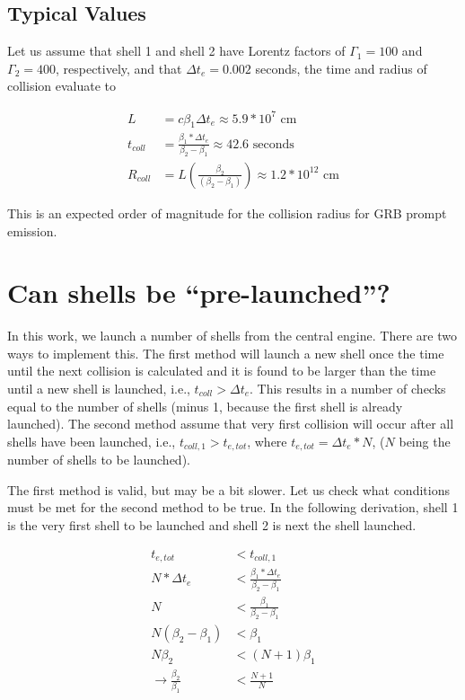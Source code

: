 \documentclass[10pt]{article}
\begin{document}
\subsection*{Typical Values}

Let us assume that shell 1 and shell 2 have Lorentz factors of $\Gamma_1=100$ and $\Gamma_2=400$, respectively, and that $\Delta t_e = 0.002$ seconds, the time and radius of collision evaluate to

\begin{align}
	L &= c\beta_1\Delta t_e \approx 5.9*10^7 \text{ cm}\\
	t_{coll} &= \frac{\beta_1 * \Delta t_e}{\beta_2 - \beta_1} \approx 42.6 \text{ seconds}\\
	R_{coll} &= L(\frac{\beta_2}{(\beta_2 - \beta_1)}) \approx 1.2*10^{12} \text{ cm}
\end{align}

This is an expected order of magnitude for the collision radius for GRB prompt emission.

\section*{Can shells be ``pre-launched''?}

In this work, we launch a number of shells from the central engine. There are two ways to implement this. The first method will launch a new shell once the time until the next collision is calculated and it is found to be larger than the time until a new shell is launched, i.e., $t_{coll} > \Delta t_e$. This results in a number of checks equal to the number of shells (minus 1, because the first shell is already launched). The second method assume that very first collision will occur after all shells have been launched, i.e., $t_{coll,1} > t_{e,tot}$, where $t_{e,tot} = \Delta t_e * N$, ($N$ being the number of shells to be launched). 

The first method is valid, but may be a bit slower. Let us check what conditions must be met for the second method to be true. In the following derivation, shell 1 is the very first shell to be launched and shell 2 is next the shell launched.

\begin{align}
	t_{e,tot} &< t_{coll,1} \\
	N*\Delta t_e &< \frac{\beta_1 * \Delta t_e}{\beta_2 - \beta_1}\\
	N &< \frac{\beta_1}{\beta_2 - \beta_1} \\ 
	N(\beta_2 - \beta_1) &< \beta_1 \\
	N\beta_2 &< (N+1)\beta_1 \\
	\rightarrow \frac{\beta_2}{\beta_1} &< \frac{N+1}{N} \label{beta condition}
\end{align}
\end{document}
